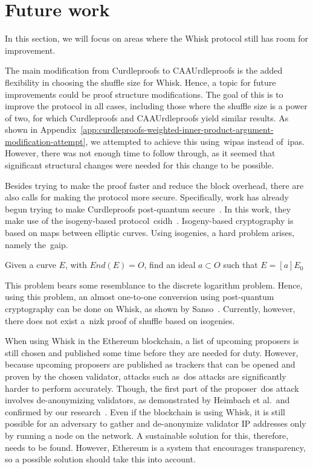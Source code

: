 \section{Future work}\label{sec:future-works}
In this section, we will focus on areas where the Whisk protocol still has room for improvement.

The main modification from Curdleproofs to CAAUrdleproofs is the added flexibility in choosing the shuffle size for Whisk.
Hence, a topic for future improvements could be proof structure modifications.
The goal of this is to improve the protocol in all cases, including those where the shuffle size is a power of two, for which Curdleproofs and CAAUrdleproofs yield similar results.
As shown in Appendix~\ref{app:curdleproofs-weighted-inner-product-argument-modification-attempt}, we attempted to achieve this using~\glspl{wipa} instead of~\glspl{ipa}.
However, there was not enough time to follow through, as it seemed that significant structural changes were needed for this change to be possible.


Besides trying to make the proof faster and reduce the block overhead, there are also calls for making the protocol more secure.
Specifically, work has already begun trying to make Curdleproofs post-quantum secure~\cite{pqwhisk}.
In this work, they make use of the isogeny-based protocol~\gls{csidh}~\cite{10.1007/978-3-030-03332-3_15}.
Isogeny-based cryptography is based on maps between elliptic curves.
Using isogenies, a hard problem arises, namely the~\gls{gaip}.
\begin{definition}
    Given a curve $E$, with $End(E)=O$, find an ideal $a\subset O$ such that $E=[a]E_0$
\end{definition}
This problem bears some resemblance to the discrete logarithm problem.
Hence, using this problem, an almost one-to-one conversion using post-quantum cryptography can be done on Whisk, as shown by Sanso~\cite{pqwhisk}.
Currently, however, there does not exist a~\gls{nizk} proof of shuffle based on isogenies.


When using Whisk in the Ethereum blockchain, a list of upcoming proposers is still chosen and published some time before they are needed for duty.
However, because upcoming proposers are published as trackers that can be opened and proven by the chosen validator, attacks such as~\gls{dos} attacks are significantly harder to perform accurately.
Though, the first part of the proposer~\gls{dos} attack involves de-anonymizing validators, as demonstrated by Heimbach et al.~and confirmed by our research~\cite{heimbach2024deanonymizingethereumvalidatorsp2p,ouroldpaper}.
Even if the blockchain is using Whisk, it is still possible for an adversary to gather and de-anonymize validator IP addresses only by running a node on the network.
A sustainable solution for this, therefore, needs to be found.
However, Ethereum is a system that encourages transparency, so a possible solution should take this into account.
